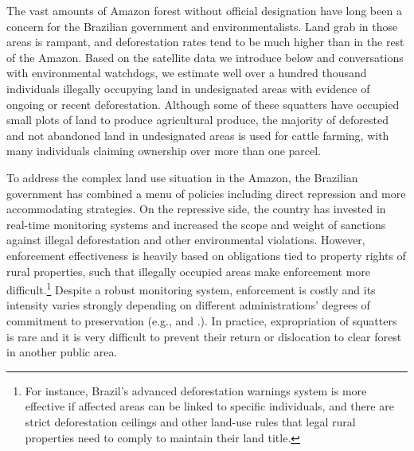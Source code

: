 \documentclass[12pt]{article}
\begin{document}
\quad The vast amounts of Amazon forest without official designation have long been a concern for the Brazilian government and environmentalists. Land grab in those areas is rampant, and deforestation rates tend to be much higher than in the rest of the Amazon. Based on the satellite data we introduce below and conversations with environmental watchdogs, we estimate well over a hundred thousand individuals illegally occupying land in undesignated areas with evidence of ongoing or recent deforestation. Although some of these squatters have occupied small plots of land to produce agricultural produce, the majority of deforested and not abandoned land in undesignated areas is used for cattle farming, with many individuals claiming ownership over more than one parcel.  
\ 

\quad To address the complex land use situation in the Amazon, the Brazilian government has combined a menu of policies including direct repression and more accommodating strategies. On the repressive side, the country has invested in real-time monitoring systems and increased the scope and weight of sanctions against illegal deforestation and other environmental violations. However, enforcement effectiveness is heavily based on obligations tied to property rights of rural properties, such that illegally occupied areas make enforcement more difficult.\footnote{For instance, Brazil's advanced deforestation warnings system is more effective if affected areas can be linked to specific individuals, and there are strict deforestation ceilings and other land-use rules that legal rural properties need to comply to maintain their land title.} Despite a robust monitoring system, enforcement is costly and its intensity varies strongly depending on different administrations' degrees of commitment to preservation (e.g., \cite{10.1257/app.20200196} and \citet{burgess2023national}.). In practice, expropriation of squatters is rare and it is very difficult to prevent their return or dislocation to clear forest in another public area. 
\ 
\end{document}
